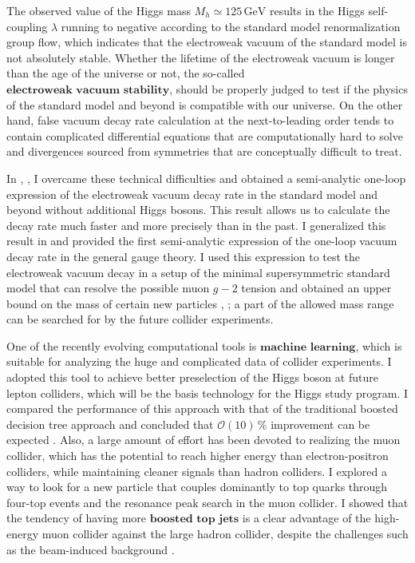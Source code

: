 \documentclass[12pt]{article}
\begin{document}
The observed value of the Higgs mass $M_h \simeq 125\,\mathrm{GeV}$ results in the Higgs self-coupling $\lambda$ running to negative according to the standard model renormalization group flow, which indicates that the electroweak vacuum of the standard model is not absolutely stable.
Whether the lifetime of the electroweak vacuum is longer than the age of the universe or not, the so-called $\textbf{electroweak vacuum stability}$, should be properly judged to test if the physics of the standard model and beyond is compatible with our universe.
On the other hand, false vacuum decay rate calculation at the next-to-leading order tends to contain complicated differential equations that are computationally hard to solve and divergences sourced from symmetries that are conceptually difficult to treat.

In \cite{Chigusa:2017dux}, \cite{Chigusa:2018uuj}, I overcame these technical difficulties and obtained a semi-analytic one-loop expression of the electroweak vacuum decay rate in the standard model and beyond without additional Higgs bosons.
This result allows us to calculate the decay rate much faster and more precisely than in the past.
I generalized this result in \cite{Chigusa:2020jbn} and provided the first semi-analytic expression of the one-loop vacuum decay rate in the general gauge theory.
I used this expression to test the electroweak vacuum decay in a setup of the minimal supersymmetric standard model that can resolve the possible muon $g-2$ tension and obtained an upper bound on the mass of certain new particles \cite{Chigusa:2022xpq}, \cite{Chigusa:2023mqy}; a part of the allowed mass range can be searched for by the future collider experiments.

One of the recently evolving computational tools is $\textbf{machine learning}$, which is suitable for analyzing the huge and complicated data of collider experiments.
I adopted this tool to achieve better preselection of the Higgs boson at future lepton colliders, which will be the basis technology for the Higgs study program.
I compared the performance of this approach with that of the traditional boosted decision tree approach and concluded that $\mathcal{O}(10)\,\%$ improvement can be expected \cite{Chigusa:2022svv}.
Also, a large amount of effort has been devoted to realizing the muon collider, which has the potential to reach higher energy than electron-positron colliders, while maintaining cleaner signals than hadron colliders.
I explored a way to look for a new particle that couples dominantly to top quarks through four-top events and the resonance peak search in the muon collider.
I showed that the tendency of having more $\textbf{boosted top jets}$ is a clear advantage of the high-energy muon collider against the large hadron collider, despite the challenges such as the beam-induced background \cite{Chigusa:2023rrz}.
\end{document}
